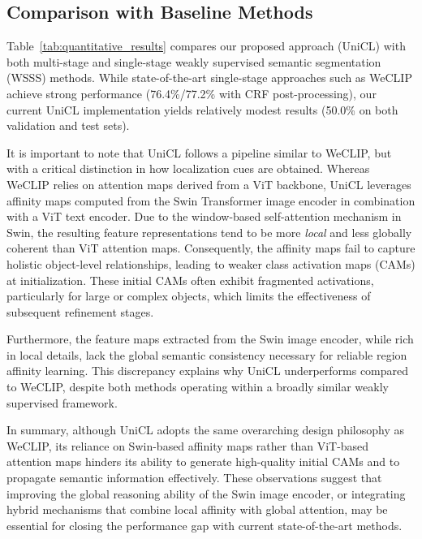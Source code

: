 \subsection{Comparison with Baseline Methods}
\label{subsec:comparison_with_baseline_methods}
Table~\ref{tab:quantitative_results} compares our proposed approach (UniCL) with both multi-stage and single-stage weakly supervised semantic segmentation (WSSS) methods. While state-of-the-art single-stage approaches such as WeCLIP achieve strong performance (76.4\%/77.2\% with CRF post-processing), our current UniCL implementation yields relatively modest results (50.0\% on both validation and test sets).  

It is important to note that UniCL follows a pipeline similar to WeCLIP, but with a critical distinction in how localization cues are obtained. Whereas WeCLIP relies on attention maps derived from a ViT backbone, UniCL leverages affinity maps computed from the Swin Transformer image encoder in combination with a ViT text encoder. Due to the window-based self-attention mechanism in Swin, the resulting feature representations tend to be more \textit{local} and less globally coherent than ViT attention maps. Consequently, the affinity maps fail to capture holistic object-level relationships, leading to weaker class activation maps (CAMs) at initialization. These initial CAMs often exhibit fragmented activations, particularly for large or complex objects, which limits the effectiveness of subsequent refinement stages.  

Furthermore, the feature maps extracted from the Swin image encoder, while rich in local details, lack the global semantic consistency necessary for reliable region affinity learning. This discrepancy explains why UniCL underperforms compared to WeCLIP, despite both methods operating within a broadly similar weakly supervised framework.  

In summary, although UniCL adopts the same overarching design philosophy as WeCLIP, its reliance on Swin-based affinity maps rather than ViT-based attention maps hinders its ability to generate high-quality initial CAMs and to propagate semantic information effectively. These observations suggest that improving the global reasoning ability of the Swin image encoder, or integrating hybrid mechanisms that combine local affinity with global attention, may be essential for closing the performance gap with current state-of-the-art methods.



